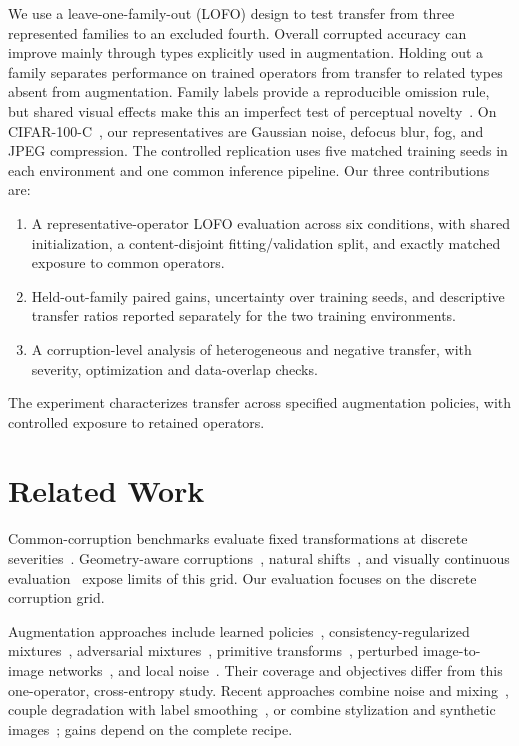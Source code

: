 \documentclass[twoside,a4paper,11pt]{article}
\begin{document}
We use a leave-one-family-out (LOFO) design to test transfer from three represented families to an excluded fourth. Overall corrupted accuracy can improve mainly through types explicitly used in augmentation. Holding out a family separates performance on trained operators from transfer to related types absent from augmentation. Family labels provide a reproducible omission rule, but shared visual effects make this an imperfect test of perceptual novelty~\cite{mintun2021interaction}. On CIFAR-100-C~\cite{hendrycks2019cifar100c}, our representatives are Gaussian noise, defocus blur, fog, and JPEG compression. The controlled replication uses five matched training seeds in each environment and one common inference pipeline. Our three contributions are:
\begin{enumerate}
\item A representative-operator LOFO evaluation across six conditions, with shared initialization, a content-disjoint fitting/validation split, and exactly matched exposure to common operators.
\item Held-out-family paired gains, uncertainty over training seeds, and descriptive transfer ratios reported separately for the two training environments.
\item A corruption-level analysis of heterogeneous and negative transfer, with severity, optimization and data-overlap checks.
\end{enumerate}
The experiment characterizes transfer across specified augmentation policies, with controlled exposure to retained operators.

\section{Related Work}
Common-corruption benchmarks evaluate fixed transformations at discrete severities~\cite{hendrycks2019corruptions,hendrycks2019cifar100c}. Geometry-aware corruptions~\cite{kar2022common}, natural shifts~\cite{hendrycks2021faces,taori2020measuring}, and visually continuous evaluation~\cite{shen2025continuous,dunkel2025cns} expose limits of this grid. Our evaluation focuses on the discrete corruption grid.

Augmentation approaches include learned policies~\cite{cubuk2019autoaugment}, consistency-regularized mixtures~\cite{hendrycks2020augmix}, adversarial mixtures~\cite{wang2021augmax}, primitive transforms~\cite{modas2022prime}, perturbed image-to-image networks~\cite{hendrycks2021faces}, and local noise~\cite{lopes2019patch}. Their coverage and objectives differ from this one-operator, cross-entropy study. Recent approaches combine noise and mixing~\cite{erichson2024noisymix}, couple degradation with label smoothing~\cite{heinonen2025mollification}, or combine stylization and synthetic images~\cite{siedel2026stylized}; gains depend on the complete recipe.
\end{document}

